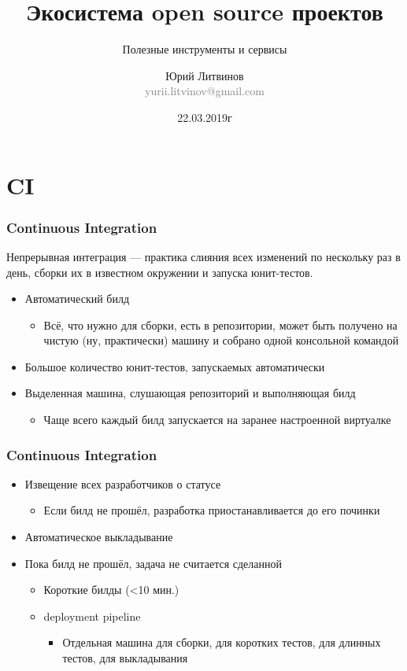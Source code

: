 \documentclass[xetex,mathserif,serif]{beamer}
\title{Экосистема open source проектов}
\subtitle{Полезные инструменты и сервисы}
\author[Юрий Литвинов]{Юрий Литвинов\\\small{\textcolor{gray}{yurii.litvinov@gmail.com}}}
\date{22.03.2019г}
\begin{document}
	\frame{\titlepage}

	\section{CI}

	\begin{frame}
		\frametitle{Continuous Integration}
		Непрерывная интеграция --- практика слияния всех изменений по нескольку раз в день, сборки их в известном окружении и запуска юнит-тестов.
		\begin{itemize}
			\item Автоматический билд
			\begin{itemize}
				\item Всё, что нужно для сборки, есть в репозитории, может быть получено на чистую (ну, практически) машину и собрано одной консольной командой
			\end{itemize}
			\item Большое количество юнит-тестов, запускаемых автоматически
			\item Выделенная машина, слушающая репозиторий и выполняющая билд
			\begin{itemize}
				\item Чаще всего каждый билд запускается на заранее настроенной виртуалке
			\end{itemize}
		\end{itemize}
	\end{frame}

	\begin{frame}
		\frametitle{Continuous Integration}
		\begin{itemize}
			\item Извещение всех разработчиков о статусе
			\begin{itemize}
				\item Если билд не прошёл, разработка приостанавливается до его починки
			\end{itemize}
			\item Автоматическое выкладывание
			\item Пока билд не прошёл, задача не считается сделанной
			\begin{itemize}
				\item Короткие билды (<10 мин.)
				\item deployment pipeline
				\begin{itemize}
					\item Отдельная машина для сборки, для коротких тестов, для длинных тестов, для выкладывания
				\end{itemize}
			\end{itemize}
		\end{itemize}
	\end{frame}
\end{document}
